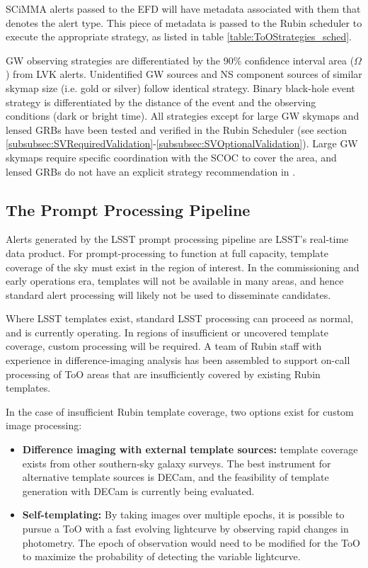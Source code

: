 SCiMMA alerts passed to the EFD will have metadata associated with them that denotes the alert type. This piece of metadata is passed to the Rubin scheduler to execute the appropriate strategy, as listed in table \ref{table:ToOStrategies_sched}.

GW observing strategies are differentiated by the 90\% confidence interval area ($\Omega$) from LVK alerts. Unidentified GW sources and NS component sources of similar skymap size (i.e. gold or silver) follow identical strategy. Binary black-hole event strategy is differentiated by the distance of the event and the observing conditions (dark or bright time). All strategies except for large GW skymaps and lensed GRBs have been tested and verified in the Rubin Scheduler (see section \ref{subsubsec:SVRequiredValidation}-\ref{subsubsec:SVOptionalValidation}). Large GW skymaps require specific coordination with the SCOC to cover the area, and lensed GRBs do not have an explicit strategy recommendation in \cite{RubinToO2024}.

\subsection{The Prompt Processing Pipeline}\label{subsec:PP}

Alerts generated by the LSST prompt processing pipeline are LSST’s real-time data product. For prompt-processing to function at full capacity, template coverage of the sky must exist in the region of interest. In the commissioning and early operations era, templates will not be available in many areas, and hence standard alert processing will likely not be used to disseminate candidates. 

Where LSST templates exist, standard LSST processing can proceed as normal, and is currently operating. In regions of insufficient or uncovered template coverage, custom processing will be required. A team of Rubin staff with experience in difference-imaging analysis has been assembled to support on-call processing of ToO areas that are insufficiently covered by existing Rubin templates.

In the case of insufficient Rubin template coverage, two options exist for custom image processing:

\begin{itemize}
    \item \textbf{Difference imaging with external template sources:} template coverage exists from other southern-sky galaxy surveys. The best instrument for alternative template sources is DECam, and the feasibility of template generation with DECam is currently being evaluated.
    \item \textbf{Self-templating:} By taking images over multiple epochs, it is possible to pursue a ToO with a fast evolving lightcurve by observing rapid changes in photometry. The epoch of observation would need to be modified for the ToO to maximize the probability of detecting the variable lightcurve. 
\end{itemize}

